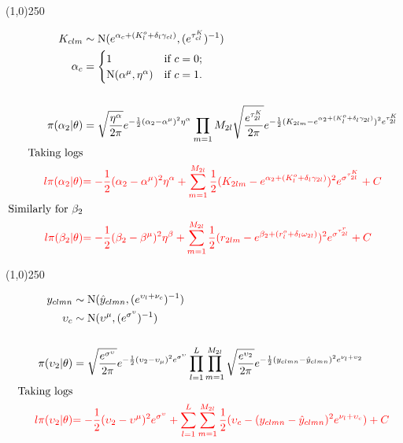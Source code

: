 \begin{center}
\line(1,0){250}
\end{center}

\begin{align*}
K_{clm} &\sim \operatorname{N}(e^{\alpha_{c}+(K_{l}^o+\delta_{l}\gamma_{cl})},(e^{ \tau_{cl}^K })^{-1})\\
\alpha_{c}&=\begin{cases}
1  & \text{if } c=0;\\
\operatorname{N}(\alpha^{\mu},\eta^{\alpha})  & \text{if } c=1.
\end{cases}\\
\\
\pi(\alpha_{2}|\theta)&=
\sqrt{\frac{\eta^{\alpha}}{2\pi}} e^{-\frac{1}{2}(\alpha_{2}-\alpha^{\mu})^{2}\eta^{\alpha} }
\prod_{m=1}{M_{2l}}
\sqrt{\frac{e^{ \tau_{2l}^K }}{2\pi}} e^{-\frac{1}{2}(K_{2lm}-e^{\alpha_{2}+(K_{l}^o+\delta_{l}\gamma_{2l})})^{2}e^{ \tau_{2l}^K } }\\
\text{Taking logs}\\
\color{red}{l\pi(\alpha_{2}|\theta)}&
\color{red}{
=-\frac{1}{2}(\alpha_{2}-\alpha^{\mu})^{2}\eta^{\alpha}  
+
\sum_{m=1}^{M_{2l}}\frac{1}{2}(K_{2lm}-e^{\alpha_{2}+(K_{l}^o+\delta_{l}\gamma_{2l})})^{2}e^{\sigma^{\tau_{2l}^K}}
+C
}\\
\text{Similarly for $\beta_{2}$}\\
\color{red}{l\pi(\beta_{2}|\theta)}&
\color{red}{
=-\frac{1}{2}(\beta_{2}-\beta^{\mu})^{2}\eta^{\beta}  
+
\sum_{m=1}^{M_{2l}}\frac{1}{2}(r_{2lm}-e^{\beta_{2}+(r_{l}^o+\delta_{l}\omega_{2l})})^{2}e^{\sigma^{\tau_{2l}^r}}
+C
}
\end{align*}


\begin{center}
\line(1,0){250}
\end{center}


\begin{align*}
y_{clmn} &\sim \operatorname{N}(\hat{y}_{clmn},(e^{ \upsilon_{l}+\nu_{c}  })^{-1} ) \\
\upsilon_{c} &\sim \operatorname{N}(\upsilon^{\mu},(e^{ \sigma^{\upsilon} })^{-1})\\
\\
\pi(\upsilon_{2}|\theta)&=\sqrt{\frac{e^{ \sigma^{\upsilon} }}{2\pi}} e^{-\frac{1}{2}(\upsilon_{2}-\upsilon_{\mu})^{2}e^{ \sigma^{\upsilon} } }
\prod_{l=1}^{L}\prod_{m=1}^{M_{2l}}\sqrt{\frac{e^{ \upsilon_{2} }}{2\pi}} e^{-\frac{1}{2}(y_{clmn}-\hat{y}_{clmn})^{2}e^{ \nu_{l} +\upsilon_{2} } }\\
\text{Taking logs}\\
\color{red}{l\pi(\upsilon_{2}|\theta)}&
\color{red}{
=-\frac{1}{2}(\upsilon_{2}-\upsilon^{\mu})^{2}e^{ \sigma^{\upsilon} } 
+
\sum_{l=1}^{L}\sum_{m=1}^{M_{2l}}\frac{1}{2}(\upsilon_{c}-(y_{clmn}-\hat{y}_{clmn})^{2}e^{\nu_{l}+\upsilon_{c} })
+C}
\end{align*}

